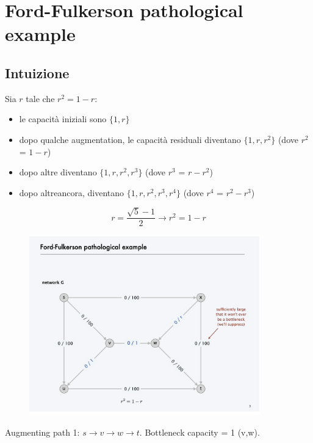 \chapter{Ford-Fulkerson pathological example}

\section{Intuizione}

Sia $r$ tale che $r^2 = 1-r$:
\begin{itemize}
    \item le capacità iniziali sono $\{1, r\}$
    \item dopo qualche augmentation, le capacità residuali 
    diventano $\{1,r,r^2\}$ (dove $r^2$ = $1-r$)
    \item dopo altre diventano $\{1,r,r^2, r^3\}$ 
    (dove $r^3$ = $r-r^2$)
    \item dopo altreancora, diventano $\{1,r,r^2, r^3, r^4\}$
    (dove $r^4$ = $r^2-r^3$)
\end{itemize}
$$
r = \frac{\sqrt{5}-1}{2} \rightarrow r^2 = 1 - r
$$

\begin{figure}[H]
    \centering
    \includegraphics[width=10cm]{Network_flow/imgs/pathological_example.png}
\end{figure}

Augmenting path 1: $s \to v \to w \to t$. Bottleneck capacity = 1
(v,w).\\

